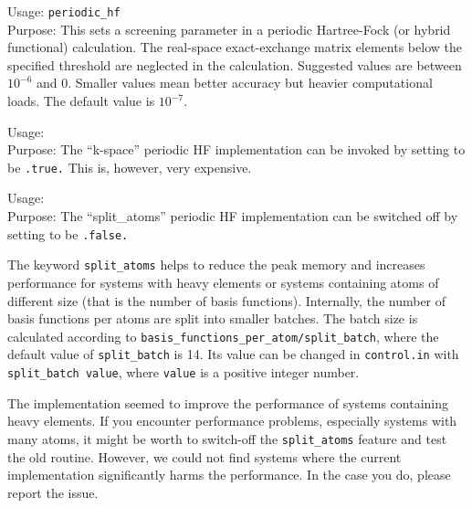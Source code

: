 { \noindent
  Usage: \texttt{periodic\_hf}   \\[1.0ex]
  Purpose: This sets a screening parameter in a periodic Hartree-Fock (or hybrid 
  functional) calculation. The real-space exact-exchange matrix elements below the specified
  threshold  are neglected in the calculation. Suggested values are between
  $10^{-6}$ and 0. Smaller values mean better accuracy but heavier computational loads.
  The default value is $10^{-7}$.
}

{ \noindent
  Usage:   \\[1.0ex]
  Purpose: The ``k-space'' periodic HF implementation can be invoked
  by setting  to be \texttt{.true.} This is, however,
  very expensive.
}


{ \noindent
  Usage:   \\[1.0ex]
  Purpose: The ``split\_atoms'' periodic HF implementation can be switched off
  by setting  to be \texttt{.false.}
}


The keyword \texttt{split\_atoms} helps to reduce the peak memory and increases
performance for systems with heavy elements or systems containing atoms of
different size (that is the number of basis functions). Internally, the number
of basis functions per atoms are split into smaller batches. The batch size is
 calculated according to \texttt{basis\_functions\_per\_atom/split\_batch}, where the
default value of \texttt{split\_batch} is 14. Its value can be changed in
\texttt{control.in} with \texttt{split\_batch value}, where \texttt{value} is a positive
integer number.

The implementation seemed to improve the performance of systems containing heavy
 elements. If you encounter performance problems, especially systems with many
atoms, it might be worth to switch-off the \texttt{split\_atoms} feature and test the
 old routine. However, we could not find systems where the current implementation
 significantly harms the performance. In the case you do, please report the issue.
